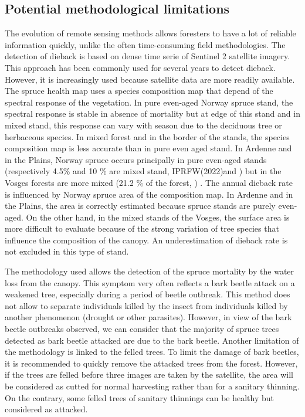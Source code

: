 \documentclass[3p,procedia]{elsarticle}
\begin{document}
\subsection{Potential methodological limitations}
The evolution of remote sensing methods allows foresters to have a lot of reliable information quickly, unlike the often time-consuming field methodologies.
The detection of dieback is based on dense time serie of Sentinel 2 satellite imagery. This approach has been commonly used for several years to detect dieback. However, it is increasingly used because satellite data are more readily available.
The spruce health map uses a species composition map that depend of the spectral response of the vegetation.
In pure even-aged Norway spruce stand, the spectral response is stable in absence of mortality but at edge of this stand and in mixed stand, this response can vary with season due to the deciduous tree or herbaceous species.
In mixed forest and in the border of the stands, the species composition map is less accurate than in pure even aged stand.
In Ardenne and in the Plains, Norway spruce occurs principally in pure even-aged stands (respectively 4.5\% and 10 \% are mixed stand, IPRFW(2022)and \citep{IGN2022}%
) but in the Vosges forests are more mixed (21.2 \% of the forest, \citep{IGN2022})    . 
The annual dieback rate is influenced by Norway spruce area of the composition map.
In Ardenne and in the Plains, the area is correctly estimated because spruce stands are purely even-aged.
On the other hand, in the mixed stands of the Vosges, the surface area is more difficult to evaluate because of the strong variation of tree species that influence the composition of the canopy.
An underestimation of dieback rate is not excluded in this type of stand.

The methodology used allows the detection of the spruce mortality by the water loss from the canopy. This symptom very often reflects a bark beetle attack on a weakened tree, especially during a period of beetle outbreak. This method does not allow to separate individuals killed by the insect from individuals killed by another phenomenon (drought or other parasites). However, in view of the bark beetle outbreaks observed, we can consider that the majority of spruce trees detected as bark beetle attacked are due to the bark beetle.
Another limitation of the methodology is linked to the felled trees.
To limit the damage of bark beetles, it is recommended to quickly remove the attacked trees from the forest.
However, if the trees are felled before three images are taken by the satellite, the area will be considered as cutted for normal harvesting  rather than for a sanitary thinning.
On the contrary, some felled trees of sanitary thinnings can be healthy but considered as attacked.
\end{document}
